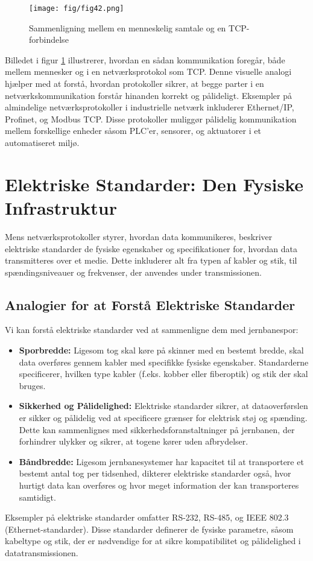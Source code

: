 \begin{figure}[h]
	\centering
	\texttt{[image: fig/fig42.png]}
	\caption{Sammenligning mellem en menneskelig samtale og en TCP-forbindelse}
	\label{fig:tcp-analogy}
\end{figure}
\noindent Billedet i figur \ref{fig:tcp-analogy} illustrerer, hvordan en sådan kommunikation foregår, både mellem mennesker og i en netværksprotokol som TCP. Denne visuelle analogi hjælper med at forstå, hvordan protokoller sikrer, at begge parter i en netværkskommunikation forstår hinanden korrekt og pålideligt.
\newline\newline\noindent
Eksempler på almindelige netværksprotokoller i industrielle netværk inkluderer Ethernet/IP, Profinet, og Modbus TCP. Disse protokoller muliggør pålidelig kommunikation mellem forskellige enheder såsom PLC'er, sensorer, og aktuatorer i et automatiseret miljø.

\section{Elektriske Standarder: Den Fysiske Infrastruktur}
Mens netværksprotokoller styrer, hvordan data kommunikeres, beskriver elektriske standarder de fysiske egenskaber og specifikationer for, hvordan data transmitteres over et medie. Dette inkluderer alt fra typen af kabler og stik, til spændingsniveauer og frekvenser, der anvendes under transmissionen.

\subsection{Analogier for at Forstå Elektriske Standarder}
Vi kan forstå elektriske standarder ved at sammenligne dem med jernbanespor:

\begin{itemize}
	\item \textbf{Sporbredde:} Ligesom tog skal køre på skinner med en bestemt bredde, skal data overføres gennem kabler med specifikke fysiske egenskaber. Standarderne specificerer, hvilken type kabler (f.eks. kobber eller fiberoptik) og stik der skal bruges.
	\item \textbf{Sikkerhed og Pålidelighed:} Elektriske standarder sikrer, at dataoverførslen er sikker og pålidelig ved at specificere grænser for elektrisk støj og spænding. Dette kan sammenlignes med sikkerhedsforanstaltninger på jernbanen, der forhindrer ulykker og sikrer, at togene kører uden afbrydelser.
	\item \textbf{Båndbredde:} Ligesom jernbanesystemer har kapacitet til at transportere et bestemt antal tog per tidsenhed, dikterer elektriske standarder også, hvor hurtigt data kan overføres og hvor meget information der kan transporteres samtidigt.
\end{itemize}
\noindent
Eksempler på elektriske standarder omfatter RS-232, RS-485, og IEEE 802.3 (Ethernet-standarder). Disse standarder definerer de fysiske parametre, såsom kabeltype og stik, der er nødvendige for at sikre kompatibilitet og pålidelighed i datatransmissionen.

